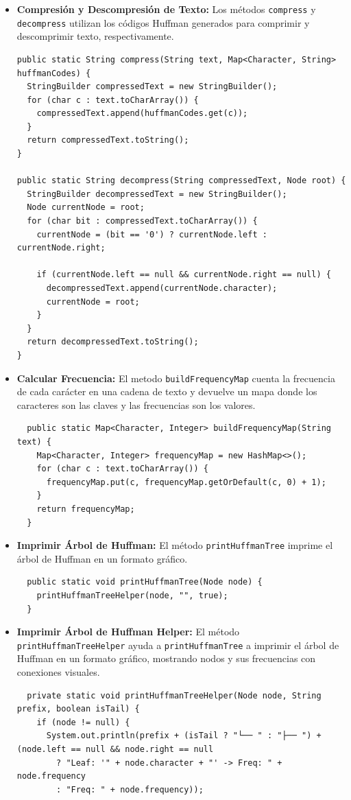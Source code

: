 \documentclass[10pt, a4paper]{article}
\newcommand{\mj}[1]{\texttt{#1}}
\begin{document}
\begin{itemize}
  \item \textbf{Compresión y Descompresión de Texto:} Los métodos \mj{compress} y \mj{decompress} utilizan los códigos Huffman generados para comprimir y descomprimir texto, respectivamente.

\begin{verbatim}
public static String compress(String text, Map<Character, String> huffmanCodes) {
  StringBuilder compressedText = new StringBuilder();
  for (char c : text.toCharArray()) {
    compressedText.append(huffmanCodes.get(c));
  }
  return compressedText.toString();
}

public static String decompress(String compressedText, Node root) {
  StringBuilder decompressedText = new StringBuilder();
  Node currentNode = root;
  for (char bit : compressedText.toCharArray()) {
    currentNode = (bit == '0') ? currentNode.left : currentNode.right;

    if (currentNode.left == null && currentNode.right == null) {
      decompressedText.append(currentNode.character);
      currentNode = root;
    }
  }
  return decompressedText.toString();
}
\end{verbatim}

  \item \textbf{Calcular Frecuencia:} El metodo \mj{buildFrequencyMap} cuenta la frecuencia de cada carácter en una cadena de texto y devuelve un mapa donde los caracteres son las claves y las frecuencias son los valores.
\begin{verbatim}
  public static Map<Character, Integer> buildFrequencyMap(String text) {
    Map<Character, Integer> frequencyMap = new HashMap<>();
    for (char c : text.toCharArray()) {
      frequencyMap.put(c, frequencyMap.getOrDefault(c, 0) + 1);
    }
    return frequencyMap;
  }
\end{verbatim}

  \item \textbf{Imprimir Árbol de Huffman:} El método \mj{printHuffmanTree} imprime el árbol de Huffman en un formato gráfico.
\begin{verbatim}
  public static void printHuffmanTree(Node node) {
    printHuffmanTreeHelper(node, "", true);
  }
\end{verbatim}

  \item \textbf{Imprimir Árbol de Huffman Helper:} El método \mj{printHuffmanTreeHelper} ayuda a \mj{printHuffmanTree} a imprimir el árbol de Huffman en un formato gráfico, mostrando nodos y sus frecuencias con conexiones visuales.
\begin{verbatim}
  private static void printHuffmanTreeHelper(Node node, String prefix, boolean isTail) {
    if (node != null) {
      System.out.println(prefix + (isTail ? "└── " : "├── ") + (node.left == null && node.right == null 
        ? "Leaf: '" + node.character + "' -> Freq: " + node.frequency  
        : "Freq: " + node.frequency));


\end{verbatim}
\end{itemize}
\end{document}

